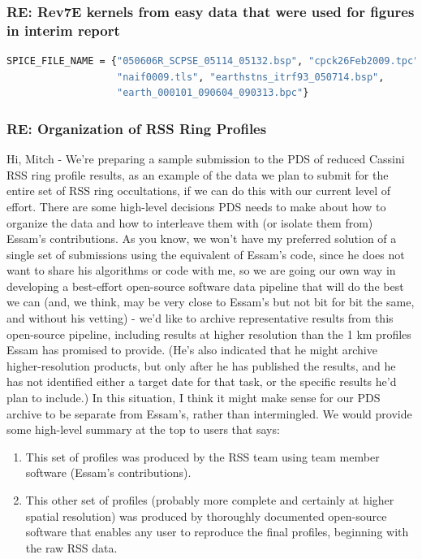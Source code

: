 \documentclass[crop=false,class=article,oneside]{standalone}
\begin{document}
\subsubsection{\footnotesize RE: Rev7E kernels from easy data that were used for figures in interim report}
\begin{lstlisting}[language=bash,basicstyle=\footnotesize]
SPICE_FILE_NAME = {"050606R_SCPSE_05114_05132.bsp", "cpck26Feb2009.tpc",
                   "naif0009.tls", "earthstns_itrf93_050714.bsp",
                   "earth_000101_090604_090313.bpc"}
\end{lstlisting}
\subsubsection{\footnotesize RE: Organization of RSS Ring Profiles}
Hi, Mitch - We're preparing a sample submission to the PDS of reduced Cassini RSS ring profile results, as an example of the data we plan to submit for the entire set of RSS ring occultations, if we can do this with our current level of effort. There are some high-level decisions PDS needs to make about how to organize the data and how to interleave them with (or isolate them from) Essam's contributions. As you know, we won't have my preferred solution of a single set of submissions using the equivalent of Essam's code, since he does not want to share his algorithms or code with me, so we are going our own way in developing a best-effort open-source software data pipeline that will do the best we can (and, we think, may be very close to Essam's but not bit for bit the same, and without his vetting) - we'd like to archive representative results from this open-source pipeline, including results at higher resolution than the 1 km profiles Essam has promised to provide. (He's also indicated that he might archive higher-resolution products, but only after he has published the results, and he has not identified either a target date for that task, or the specific results he'd plan to include.) In this situation, I think it might make sense for our PDS archive to be separate from Essam's, rather than intermingled. We would provide some high-level summary at the top to users that says:
\begin{enumerate}
    \item This set of profiles was produced by the RSS team using team member software (Essam's contributions).
    \item This other set of profiles (probably more complete and certainly at higher spatial resolution) was produced by thoroughly documented open-source software that enables any user to reproduce the final profiles, beginning with the raw RSS data.
\end{enumerate}
\end{document}
